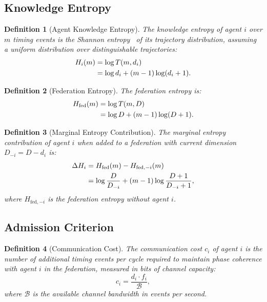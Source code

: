 \documentclass[twocolumn,10pt]{article}
\newtheorem{definition}{Definition}[section]
\begin{document}
\subsection{Knowledge Entropy}

\begin{definition}[Agent Knowledge Entropy]
\label{def:agent_entropy}
The \emph{knowledge entropy} of agent $i$ over $m$ timing events is the
Shannon entropy~\cite{Shannon1948,Cover2006} of its trajectory distribution,
assuming a uniform distribution over distinguishable trajectories:
\begin{align}
  H_i(m) &= \log T(m, d_i) \notag \\
           &= \log d_i + (m-1)\log(d_i + 1).
\label{eq:agent_entropy}
\end{align}
\end{definition}

\begin{definition}[Federation Entropy]
\label{def:fed_entropy}
The \emph{federation entropy} is:
\begin{align}
  H_{\mathrm{fed}}(m) &= \log T(m, D) \notag \\
                       &= \log D + (m-1)\log(D+1).
\label{eq:fed_entropy}
\end{align}
\end{definition}

\begin{definition}[Marginal Entropy Contribution]
\label{def:marginal}
The \emph{marginal entropy contribution} of agent $i$ when added to a
federation with current dimension $D_{-i} = D - d_i$ is:
\begin{align}
  \Delta H_i &= H_{\mathrm{fed}}(m) - H_{\mathrm{fed},-i}(m) \notag \\
              &= \log\frac{D}{D_{-i}} + (m-1)\log\frac{D+1}{D_{-i}+1},
\label{eq:marginal}
\end{align}
where $H_{\mathrm{fed},-i}$ is the federation entropy without agent $i$.
\end{definition}

\subsection{Admission Criterion}

\begin{definition}[Communication Cost]
\label{def:comm_cost}
The \emph{communication cost} $c_i$ of agent $i$ is the number of additional
timing events per cycle required to maintain phase coherence with agent $i$
in the federation, measured in bits of channel capacity:
\[
  c_i = \frac{d_i \cdot f_i}{\mathcal{B}},
\]
where $\mathcal{B}$ is the available channel bandwidth in events per second.
\end{definition}
\end{document}
